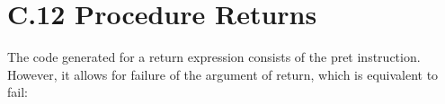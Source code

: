 \begin{center}
\tabletail{}
\tablelasttail{}
\begin{supertabular}{|m{1.9073598in}|m{2.75596in}|}

\end{supertabular}
\end{center}


\section[C.12 Procedure Returns]{C.12 Procedure Returns}

The code generated for a return expression consists of the pret
instruction. However, it allows for failure of the argument of return,
which is equivalent to fail:

